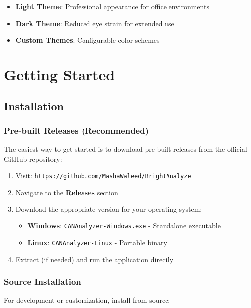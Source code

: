 \documentclass[11pt,a4paper]{article}
\begin{document}
\begin{itemize}
    \item \textbf{Light Theme}: Professional appearance for office environments
    \item \textbf{Dark Theme}: Reduced eye strain for extended use
    \item \textbf{Custom Themes}: Configurable color schemes
\end{itemize}

\section{Getting Started}

\subsection{Installation}

\subsubsection{Pre-built Releases (Recommended)}

The easiest way to get started is to download pre-built releases from the official GitHub repository:

\begin{enumerate}
    \item Visit: \texttt{https://github.com/MashaWaleed/BrightAnalyze}
    \item Navigate to the \textbf{Releases} section
    \item Download the appropriate version for your operating system:
    \begin{itemize}
        \item \textbf{Windows}: \texttt{CANAnalyzer-Windows.exe} - Standalone executable
        \item \textbf{Linux}: \texttt{CANAnalyzer-Linux} - Portable binary
    \end{itemize}
    \item Extract (if needed) and run the application directly
\end{enumerate}

\subsubsection{Source Installation}

For development or customization, install from source:
\end{document}
